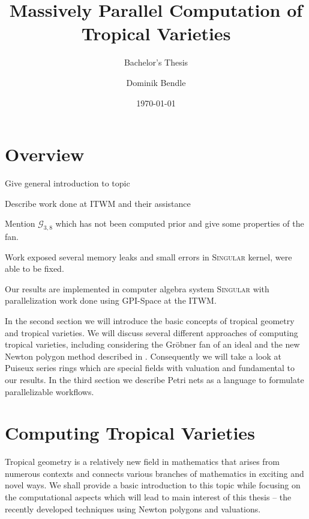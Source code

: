 \documentclass[
  paper=a4,
  titlepage,
  bibliography=totoc,
  listof=totoc,
  pagesize=pdftex
]{scrartcl}
\title{Massively Parallel Computation of Tropical Varieties}
\subtitle{Bachelor's Thesis}
\author{Dominik Bendle}
\date{\today}
\numberwithin{figure}{section}
\numberwithin{equation}{section}
\numberwithin{table}{section}
\theoremstyle{definition}
\numberwithin{definition}{section}
\begin{document}
\pagestyle{headings}

\maketitle

\tableofcontents
\newpage

\section{Overview}

Give general introduction to topic

Describe work done at ITWM and their assistance

Mention $\mathcal G_{3,8}$ which has not been computed prior and give some properties of the
fan.

Work exposed several memory leaks and small errors in \textsc{Singular} kernel, were able
to be fixed.

Our results are implemented in computer algebra system \textsc{Singular} \cite{Singular}
with parallelization work done using GPI-Space at the ITWM.


In the second section we will introduce the basic concepts of tropical geometry and
tropical varieties. We will discuss several different approaches of computing tropical
varieties, including considering the Gröbner fan of an ideal and the new Newton polygon
method described in \cite{tropPointsLinks}. Consequently we will take a look at Puiseux
series rings which are special fields with valuation and fundamental to our results. In
the third section we describe Petri nets as a language to formulate parallelizable
workflows.


\section{Computing Tropical Varieties}

Tropical geometry is a relatively new field in mathematics that arises from numerous
contexts and connects various branches of mathematics in exciting and novel ways. We shall
provide a basic introduction to this topic while focusing on the computational aspects
which will lead to main interest of this thesis -- the recently developed techniques using
Newton polygons and valuations.
\end{document}
